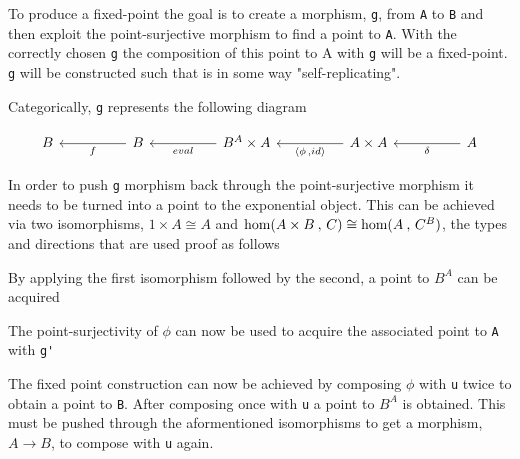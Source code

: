 To produce a fixed-point the goal is to create a morphism, \verb|g|,  from \verb|A| to
\verb|B| and then exploit the point-surjective morphism to find a point to
\verb|A|. With the correctly chosen \verb|g| the composition of this point to A
with \verb|g| will be a fixed-point. \verb|g| will be constructed such that is
in some way "self-replicating".


Categorically, \verb|g| represents the following diagram

\[\begin{tikzcd}[sep=huge]
    B & B \arrow[l, "f"] & B^A \times A \arrow[l, "eval"] & A \times A \arrow[l,
    "{\langle \phi \, , id\rangle}"] & A \arrow[l, "\delta"]
\end{tikzcd}\]

In order to push \verb|g| morphism back through the point-surjective morphism
it needs to be turned into a point to the exponential object. This can be
achieved via two isomorphisms, $1 \times A \cong A$ and $\textnormal{hom}(A \times B \: , \, C)
\cong \textnormal{hom}(A \: , \, C^B)$, the types and directions that are used proof as
follows

\begin{AgdaMultiCode}
\end{AgdaMultiCode}

By applying the first isomorphism followed by the second, a point to $B^A$ can
be acquired
\begin{AgdaAlign}

The point-surjectivity of $\phi$ can now be used to acquire the associated point
to \verb|A| with \verb|g'|

\end{AgdaAlign}

The fixed point construction can now be achieved by composing $\phi$ with
\verb|u| twice to obtain a point to \verb|B|. After composing once with \verb|u|
a point to $B^A$ is obtained. This must be pushed through the aformentioned
isomorphisms to get a morphism, $A \rightarrow B$, to compose with \verb|u|
again.


